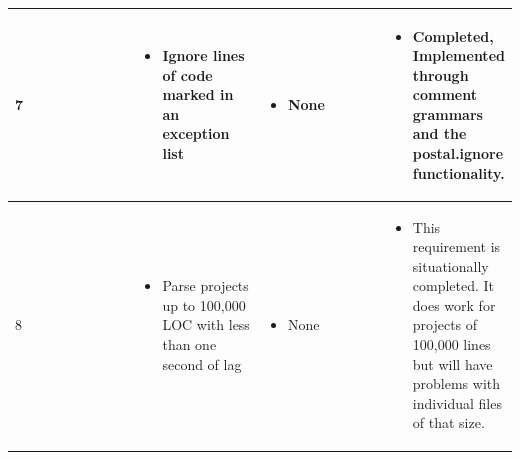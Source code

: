 \documentclass[letterpaper,10pt,titlepage,draftclsnofoot,onecolumn,onesided] {IEEEtran}
\begin{document}
{\begin{center}
\begin{singlespace}
\begin{tabular}{ |  p{0.25\linewidth}  |  p{0.25\linewidth}  | p{0.25\linewidth} | p{0.25\linewidth} |}
        	7
		& 
			\begin{itemize}
				\item Ignore lines of code marked in an exception list
			\end{itemize}
		& 
			\begin{itemize}
				\item None
			\end{itemize}
		&
			\begin{itemize}
				\item Completed, Implemented through comment grammars and the postal.ignore functionality.
			\end{itemize} 
		
        \\ \hline

        	8
		& 
			\begin{itemize}
				\item Parse projects up to 100,000 LOC with less than one second of lag
			\end{itemize}
		& 
			\begin{itemize}
				\item None
			\end{itemize}
		&
			\begin{itemize}
				\item This requirement is situationally completed. 
                It does work for projects of 100,000 lines but will have problems with individual files of that size.
			\end{itemize} 
		
        \\ \hline
		\end{tabular}
	\end{singlespace}
\end{center}
}
\end{document}
